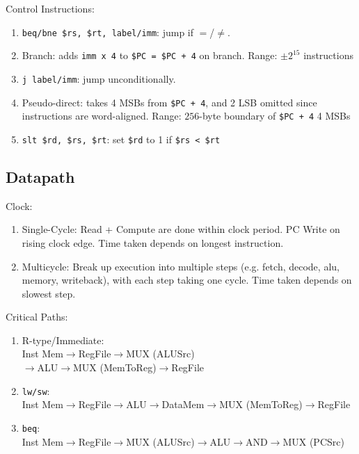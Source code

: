 \documentclass[12pt, a4paper]{article}
\begin{document}
\begin{multicols*}{3}
Control Instructions:
\begin{enumerate}[\roman*.]
  \item \lstinline|beq/bne $rs, $rt, label/imm|: jump if $=$/$\neq$.
  \item Branch: adds \lstinline|imm x 4| to \lstinline|$PC = $PC + 4| on branch. Range: $\pm 2^{15}$ instructions
  \item \lstinline|j label/imm|: jump unconditionally.
  \item Pseudo-direct: takes 4 MSBs from \lstinline|$PC + 4|, and 2 LSB omitted since instructions are word-aligned. Range: $256$-byte boundary of \lstinline|$PC + 4| 4 MSBs
  \item \lstinline|slt $rd, $rs, $rt|: set \lstinline|$rd| to 1 if \lstinline|$rs < $rt|
\end{enumerate}
\colbreak

\subsection{Datapath}

Clock:
\begin{enumerate}[\roman*.]
  \item Single-Cycle: Read + Compute are done within clock period. PC Write on rising clock edge. Time taken depends on longest instruction.
  \item Multicycle: Break up execution into multiple steps (e.g. fetch, decode, alu, memory, writeback), with each step taking one cycle. Time taken depends on slowest step.
\end{enumerate}

Critical Paths:
\begin{enumerate}[\roman*.]
  \item R-type/Immediate:\\
    Inst Mem$\rightarrow$RegFile$\rightarrow$MUX (ALUSrc)\\$\rightarrow$ALU$\rightarrow$MUX (MemToReg)$\rightarrow$RegFile
  \item \lstinline|lw/sw|:\\
    Inst Mem$\rightarrow$RegFile$\rightarrow$ALU$\rightarrow$DataMem$\rightarrow$MUX (MemToReg)$\rightarrow$RegFile
  \item \lstinline|beq|:\\
    Inst Mem$\rightarrow$RegFile$\rightarrow$MUX (ALUSrc)$\rightarrow$ALU$\rightarrow$AND$\rightarrow$MUX (PCSrc)
\end{enumerate}


\end{multicols*}
\end{document}
